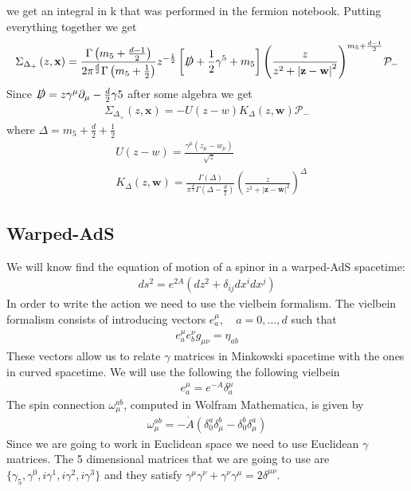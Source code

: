 \documentclass[12pt,a4paper]{article}
\begin{document}
we get an integral in k that was performed in the fermion notebook. Putting everything together we get
\begin{align}
    \Sigma_{\Delta_{+}} \left(z, \mathbf{x}\right) = \frac{\Gamma\left( m_5 + \frac{d-1}{2}\right)}{2 \pi^{\frac{d}{2}} \Gamma\left( m_5 + \frac{1}{2}\right)} z^{-\frac{1}{2}} \left[ \slashed{D} + \frac{1}{2}\gamma^5+ m_5 \right] {\left(\frac{z}{z^2+{\left| \mathbf{z} - \mathbf{w} \right|}^2}\right)}^{m_5 + \frac{d-1}{2}} \mathcal{P}_{-}
\end{align}
Since $\slashed{D} = z \gamma^{\mu} \partial_\mu - \frac{d}{2} \gamma5 $ after some algebra we get
\begin{align}
    \Sigma_{\Delta_{+}} \left(z, \mathbf{x}\right) = - U \left(z - w \right) K_\Delta \left(z, \mathbf{w}\right) \mathcal{P}_{-}
\end{align}
where $\Delta = m_5 + \frac{d}{2} + \frac{1}{2}$ 
\begin{align}
    & U\left(z - w \right) = \frac{\gamma^{\mu} \left( z_\mu - w_\mu \right)}{\sqrt{z}} \\
    & K_\Delta \left(z, \mathbf{w}\right) = \frac{\Gamma\left( \Delta \right)}{\pi^{\frac{d}{2}} \Gamma\left( \Delta - \frac{d}{2} \right)} {\left( \frac{z}{z^2 + {\left| \mathbf{z} - \mathbf{w} \right|}^2} \right)}^\Delta
\end{align}
\subsection{Warped-AdS}
We will know find the equation of motion of a spinor in a warped-AdS spacetime:
\begin{align}
    ds^2 = e^{2 A } \left( dz^2 + \delta_{ij}dx^i dx^j \right)
\end{align}
In order to write the action we need to use the vielbein formalism. The vielbein formalism consists of introducing vectors $e^{\mu}_a,\quad a = 0,\dots,d$ such that
\begin{align}
    e^{\mu}_a e^{\nu}_b g_{\mu \nu} = \eta_{a b}
\end{align}
These vectors allow us to relate $\gamma$ matrices in Minkowski spacetime with the ones in curved spacetime. We will use the following the following vielbein
\begin{align}
    e^\mu_a = e^{-A} \delta^\mu_a
\end{align}
The spin connection $\omega_\mu^{ab}$, computed in Wolfram Mathematica, is given by
\begin{align}
    \omega_\mu^{ab} = -\dot{A} \left( \delta_0^a \delta_\mu^b - \delta_0^b \delta_\mu^a \right)
\end{align}
Since we are going to work in Euclidean space we need to use Euclidean $\gamma$ matrices. The 5 dimensional matrices that we are going to use are $\{ \gamma_5, \gamma^0, i \gamma^1, i \gamma^2, i \gamma^3 \}$ and they satisfy $\gamma^\mu \gamma^\nu + \gamma^\nu \gamma^\mu = 2 \delta^{\mu \nu}$.
\end{document}
